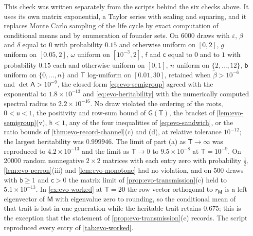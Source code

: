 \begin{numcheck}\label{chk:evo-independent}
This check was written separately from the scripts behind the six checks above. It uses its own matrix exponential, a Taylor series with scaling and squaring, and it replaces Monte Carlo sampling of the life cycle by exact computation of conditional means and by enumeration of founder sets. On 6000 draws with $\varepsilon$, $\beta$ and $\delta$ equal to $0$ with probability $0.15$ and otherwise uniform on $[0,2]$, $g$ uniform on $[0.05,2]$, $\omega$ uniform on $[10^{-3},2]$, $\mathsf f$ and $\mathsf c$ equal to $0$ and to $1$ with probability $0.15$ each and otherwise uniform on $[0,1]$, $n$ uniform on $\{2,\dots,12\}$, $\mathsf b$ uniform on $\{0,\dots,n\}$ and $\mathsf T$ log-uniform on $[0.01,30]$, retained when $\tilde\beta>10^{-6}$ and $\det\mathsf A>10^{-9}$, the closed form \eqref{eq:evo-semigroup} agreed with the exponential to $1.8\times10^{-13}$ and \eqref{eq:evo-heritability} with the numerically computed spectral radius to $2.2\times10^{-16}$. No draw violated the ordering of the roots, $0<\mathsf u<1$, the positivity and row-sum bound of $\mathsf G(\mathsf T)$, the bracket of \cref{lem:evo-semigroup}(v), $\mathsf h<1$, any of the four inequalities of \eqref{eq:evo-sandwich}, or the ratio bounds of \cref{thm:evo-record-channel}(c) and (d), at relative tolerance $10^{-12}$; the largest heritability was $0.999946$. The limit of part (a) as $\mathsf T\to\infty$ was reproduced to $4.2\times10^{-13}$ and the limit as $\mathsf T\to0$ to $9.5\times10^{-8}$ at $\mathsf T=10^{-9}$. On 20000 random nonnegative $2\times2$ matrices with each entry zero with probability $\frac12$, \cref{lem:evo-perron}(iii) and \cref{lem:evo-monotone} had no violation, and on 500 draws with $\mathsf b\ge1$ and $\mathsf c>0$ the matrix limit of \cref{prop:evo-transmission}(c) held to $5.1\times10^{-13}$. In \cref{ex:evo-worked} at $\mathsf T=20$ the row vector orthogonal to $r_{\mathsf M}$ is a left eigenvector of $\mathsf M$ with eigenvalue zero to rounding, so the conditional mean of that trait is lost in one generation while the heritable trait retains $0.675$; this is the exception that the statement of \cref{prop:evo-transmission}(c) records. The script reproduced every entry of \cref{tab:evo-worked}.


\end{numcheck}
